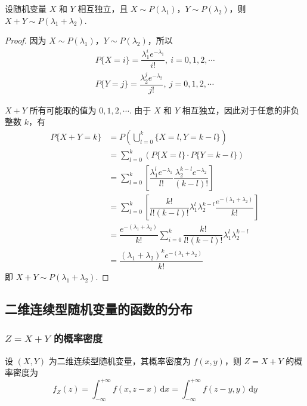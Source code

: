 \begin{conclusion}
    设随机变量 $X$ 和 $Y$ 相互独立，且 $X \sim P(\lambda_1)$，$Y \sim P(\lambda_2)$，则 $X+Y \sim P(\lambda_1 + \lambda_2)$.
\end{conclusion}

\begin{proof}
    因为 $X \sim P(\lambda_1)$，$Y \sim P(\lambda_2)$，所以
    \begin{gather*}
        P\{X=i\} = \dfrac{\lambda_1^i e^{-\lambda_1}}{i!},\ i=0,1,2,\cdots \\[0.5em]
        P\{Y=j\} = \dfrac{\lambda_2^j e^{-\lambda_2}}{j!},\ j=0,1,2,\cdots
    \end{gather*}

    $X+Y$ 所有可能取的值为 $0,1,2,\cdots$. 由于 $X$ 和 $Y$ 相互独立，因此对于任意的非负整数 $k$，有
    $$
    \begin{aligned}
        P\{X+Y=k\} &= P(\bigcup_{l=0}^k \{X=l, Y=k-l\}) \\
        &= \sum_{l=0}^k (P\{X=l\} \cdot P\{Y=k-l\}) \\
        &= \sum_{l=0}^k \left[ \dfrac{\lambda_1^l e^{-\lambda_1}}{l!} \dfrac{\lambda_2^{k-l} e^{-\lambda_2}}{(k-l)!} \right] \\
        &= \sum_{l=0}^k \left[ \dfrac{k!}{l!(k-l)!} \lambda_1^l \lambda_2^{k-l} \dfrac{e^{-(\lambda_1 + \lambda_2)}}{k!} \right] \\
        &= \dfrac{e^{-(\lambda_1 + \lambda_2)}}{k!} \sum_{i=0}^k \dfrac{k!}{l!(k-l)!} \lambda_1^l \lambda_2^{k-l} \\
        &= \dfrac{(\lambda_1 + \lambda_2)^k e^{-(\lambda_1 + \lambda_2)}}{k!}
    \end{aligned}
    $$
    即 $X+Y \sim P(\lambda_1 + \lambda_2)$.
\end{proof}

\subsection{二维连续型随机变量的函数的分布}

\subsubsection{\texorpdfstring{$Z=X+Y$}{} 的概率密度}

\begin{conclusion}
    设 $(X,Y)$ 为二维连续型随机变量，其概率密度为 $f(x,y)$，则 $Z=X+Y$ 的概率密度为
    $$
    f_{Z}(z) = \int_{-\infty}^{+\infty} f(x,z-x) \, \text{d}x = \int_{-\infty}^{+\infty} f(z-y,y) \, \text{d}y
    $$
\end{conclusion}

